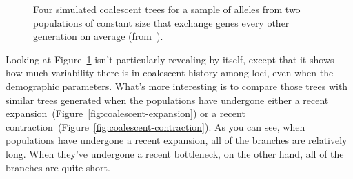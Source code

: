 \documentclass[12pt]{article}
\begin{document}
\begin{figure}
\begin{center}
\end{center}
\caption{Four simulated coalescent trees for a sample of alleles from
  two populations of constant size that exchange genes every other
  generation on average (from~\cite{Harpending-etal-1998}).}\label{fig:coalescent-constant}
\end{figure}

Looking at Figure~\ref{fig:coalescent-constant} isn't particularly
revealing by itself, except that it shows how much variability there
is in coalescent history among loci, even when the demographic
parameters. What's more interesting is to compare those trees with
similar trees generated when the populations have undergone either a
recent expansion~(Figure~\ref{fig:coalescent-expansion}) or a recent
contraction~(Figure~\ref{fig:coalescent-contraction}). As you can see,
when populations have undergone a recent expansion, all of the
branches are relatively long. When they've undergone a recent
bottleneck, on the other hand, all of the branches are quite
short.
\end{document}
